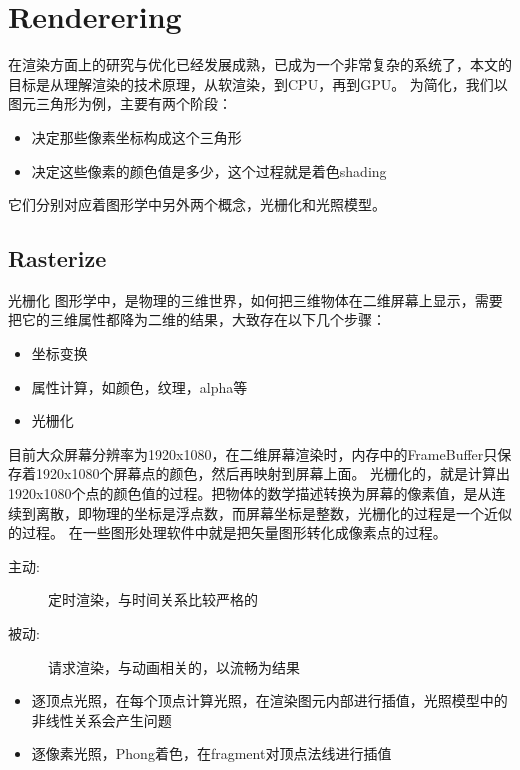 \chapter{Renderering}

在渲染方面上的研究与优化已经发展成熟，已成为一个非常复杂的系统了，本文的目标是从理解渲染的技术原理，从软渲染，到CPU，再到GPU。
为简化，我们以图元三角形为例，主要有两个阶段：
\begin{itemize}
    \item {决定那些像素坐标构成这个三角形}
    \item {决定这些像素的颜色值是多少，这个过程就是着色shading}
\end{itemize}
它们分别对应着图形学中另外两个概念，光栅化和光照模型。

\section{Rasterize}
光栅化
图形学中，是物理的三维世界，如何把三维物体在二维屏幕上显示，需要把它的三维属性都降为二维的结果，大致存在以下几个步骤：

\begin{itemize}
    \item {坐标变换}
    \item {属性计算，如颜色，纹理，alpha等}
    \item {光栅化}
\end{itemize}

\textsf{目前大众屏幕分辨率为1920x1080，在二维屏幕渲染时，内存中的FrameBuffer只保存着1920x1080个屏幕点的颜色，然后再映射到屏幕上面。
光栅化的，就是计算出1920x1080个点的颜色值的过程。把物体的数学描述转换为屏幕的像素值，是从连续到离散，即物理的坐标是浮点数，而屏幕坐标是整数，光栅化的过程是一个近似的过程。
在一些图形处理软件中就是把矢量图形转化成像素点的过程。}

\begin{description}
    \item [主动:] \textsf{定时渲染，与时间关系比较严格的}
    \item [被动:] \textsf{请求渲染，与动画相关的，以流畅为结果}
\end{description}


\begin{itemize}
    \item {逐顶点光照，在每个顶点计算光照，在渲染图元内部进行插值，光照模型中的非线性关系会产生问题}
    \item {逐像素光照，Phong着色，在fragment对顶点法线进行插值}
\end{itemize}



